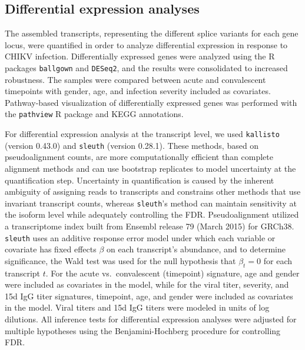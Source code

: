 \subsection{Differential expression analyses}

The assembled transcripts, representing the different splice variants for each gene locus, were quantified in order to analyze differential expression in response to CHIKV infection. Differentially expressed genes were analyzed using the R packages \texttt{ballgown}\autocite{Frazee2014,Pertea2016} and \texttt{DESeq2},\autocite{Anders2010} and the results were consolidated to increased robustness. The samples were compared between acute and convalescent timepoints with gender, age, and infection severity included as covariates. Pathway-based visualization of differentially expressed genes was performed with the \texttt{pathview}\autocite{Luo2013} R package and KEGG\autocite{Ogata1999} annotations.

For differential expression analysis at the transcript level, we used \texttt{kallisto}\autocite{Bray2016} (version 0.43.0) and \texttt{sleuth}\autocite{Pimentel2016} (version 0.28.1). These methods, based on pseudoalignment counts, are more computationally efficient than complete alignment methods and can use bootstrap replicates to model uncertainty at the quantification step.\autocite{Bray2016} Uncertainty in quantification is caused by the inherent ambiguity of assigning reads to transcripts and constrains other methods that use invariant transcript counts, whereas \texttt{sleuth}’s method can maintain sensitivity at the isoform level while adequately controlling the FDR.\autocite{Pimentel2016} Pseudoalignment utilized a transcriptome index built from Ensembl release 79 (March 2015) for GRCh38. \texttt{sleuth} uses an additive response error model under which each variable or covariate has fixed effects $\beta$ on each transcript’s abundance, and to determine significance, the Wald test was used for the null hypothesis that $\beta_t = 0$ for each transcript $t$. For the acute vs.\ convalescent (timepoint) signature, age and gender were included as covariates in the model, while for the viral titer, severity, and 15d IgG titer signatures, timepoint, age, and gender were included as covariates in the model. Viral titers and 15d IgG titers were modeled in units of log dilutions. All inference tests for differential expression analyses were adjusted for multiple hypotheses using the Benjamini-Hochberg procedure for controlling FDR.\autocite{Benjamini2001}

